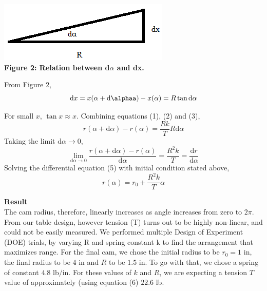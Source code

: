 \documentclass{article}
\begin{document}
\begin{center}\bigskip\includegraphics[scale=0.5]{angle.png}\\\textbf{Figure 2: Relation between d$\alpha$ and dx.} \end{center}

From Figure $2$,
\begin{equation}
    \text{d}x=x(\alpha+\text{d}\alphaa)-x(\alpha)=R\tan{\text{d}\alpha}
\end{equation}

\newpage

For small $x$, $\tan{x}\approx x$. Combining equations (1), (2) and (3),
\begin{equation}
    r(\alpha+\text{d}\alpha)-r(\alpha)=\frac{Rk}{T}R\text{d}\alpha
\end{equation}
Taking the limit $\text{d}\alpha \to 0$,
\begin{equation}
    \lim_{\text{d}\alpha \to 0}\frac{r(\alpha+\text{d}\alpha)-r(\alpha)}{\text{d}\alpha}=\frac{R^2k}{T}=\frac{\text{d}r}{\text{d}\alpha}
\end{equation}
Solving the differential equation (5) with initial condition stated above,
\begin{equation}
    r(\alpha)=r_0+\frac{R^2k}{T}\alpha
\end{equation}

\textbf{Result}\\The cam radius, therefore, linearly increases as angle increases from zero to $2\pi$. From our table design, however tension (T) turns out to be highly non-linear, and could not be easily measured. We performed multiple Design of Experiment (DOE) trials, by varying R and spring constant k to find the arrangement that maximizes range. For the final cam, we chose the initial radius to be $r_0=1$ in, the final radius to be $4$ in and $R$ to be $1.5$ in. To go with that, we chose a spring of constant $4.8$ lb$/$in. For these values of $k$ and $R$, we are expecting a tension $T$ value of approximately (using equation ($6$) $22.6$ lb.
\end{document}
